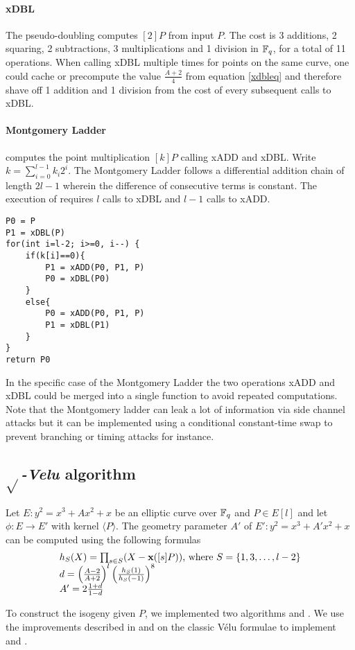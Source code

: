 \documentclass[../main.tex]{subfilesubs}
\begin{document}
\paragraph{xDBL}The pseudo-doubling  computes $[2]P$ from input $P$.  The cost is 3 additions, 2 squaring, 2 subtractions, 3 multiplications and 1 division in $\mathbb{F}_q$, for a total of 11 operations. When calling xDBL multiple times for points on the same curve, one could cache or precompute the value $\frac{A+2}{4}$ from equation \eqref{xdbleq} and therefore shave off 1 addition and 1 division from the cost of every subsequent calls to xDBL.

\paragraph{Montgomery Ladder}  computes the point multiplication $[k]P$ calling xADD and xDBL. Write $k=\sum_{i=0}^{l-1}k_i2^i$. The Montgomery Ladder follows a differential addition chain of length $2l-1$ wherein the difference of consecutive terms is constant. The execution of  requires $l$ calls to xDBL and $l-1$ calls to xADD.
\begin{verbatim}
P0 = P
P1 = xDBL(P)
for(int i=l-2; i>=0, i--) {
	if(k[i]==0){
		P1 = xADD(P0, P1, P)
		P0 = xDBL(P0)
	}
	else{
		P0 = xADD(P0, P1, P)
		P1 = xDBL(P1)
	}
}
return P0
\end{verbatim}
In the specific case of the Montgomery Ladder the two operations xADD and xDBL could be merged into a single function to avoid repeated computations.
Note that the Montgomery ladder can leak a lot of information via side channel attacks but it can be implemented using a conditional constant-time swap to prevent branching or timing attacks for instance.

\subsection{$\sqrt{}$\textit{-Velu} algorithm}

\begin{lemma}
	Let $E:y^2=x^3+Ax^2+x$ be an elliptic curve over $\mathbb{F}_q$ and $P\in E[l]$ and let $\phi:E\rightarrow E'$ with kernel $\langle P \rangle$.
	The geometry parameter $A'$ of $E' : y^2=x^3+A'x^2+x$ can be computed using the following formulas
	\begin{equation}\label{veluform}\begin{array}{l}
			h_S(X) = \prod_{s\in S}(X-\textbf{x}([s]P))\text{, where }S=\{1,3, \ldots, l-2\} \\
			d = \left(\frac{A-2}{A+2}\right)^l \left( \frac{h_S(1)}{h_S(-1)}\right)^8\\
			A'=2\frac{1+d}{1-d}
		\end{array}\end{equation}

\end{lemma}
To construct the isogeny given $P$, we implemented two algorithms  and . We use the improvements described in \cite{} and \cite{} on the classic Vélu formulae to implement  and .
\end{document}
